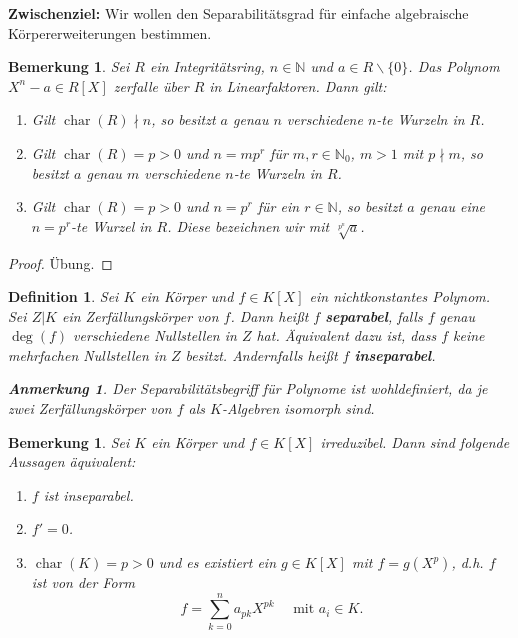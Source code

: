 \documentclass[a4paper, twoside, 11pt, ngerman]{report}
\newcommand{\NN}{\mathds N}
\renewcommand{\setminus}{\smallsetminus}
\DeclareMathOperator{\charact}{char}
\theoremstyle{definistyle}
\newtheorem{defini}[satz]{Definition}
\newtheorem{bem}[satz]{Bemerkung}
\newtheorem{anm}[satz]{Anmerkung}
\theoremstyle{remark}
\newcommand{\defn}[1]{\textit{\bfseries #1}}
\begin{document}
\textbf{Zwischenziel:} Wir wollen den Separabilitätsgrad für einfache algebraische Körpererweiterungen bestimmen.

\begin{bem}\label{bem:zerfallen_von_xn-a}
Sei $R$ ein Integritätsring, $n \in \NN$ und $a \in R\setminus\{0\}$.  
Das Polynom $X^n - a \in R[X]$ zerfalle über $R$ in Linearfaktoren. Dann gilt:
\begin{enumerate}
\item[(a)] Gilt $\charact(R)\nmid n$, so besitzt $a$ genau $n$ verschiedene $n$-te Wurzeln in $R$.
\item[(b)] Gilt $\charact(R)=p>0$ und $n = mp^r$ für $m,r\in\NN_0$, $m>1$ mit $p \nmid m$,  
so besitzt $a$ genau $m$ verschiedene $n$-te Wurzeln in $R$.
\item[(c)] Gilt $\charact(R)=p>0$ und $n = p^r$ für ein $r \in \NN$, so besitzt $a$ genau eine $n=p^r$-te Wurzel in $R$. Diese bezeichnen wir mit $\sqrt[p^n]{a}$.
\end{enumerate}
\end{bem}
\begin{proof}
Übung.
\end{proof}

\begin{defini}\label{def:separabel_polynom}
Sei $K$ ein Körper und $f \in K[X]$ ein nichtkonstantes Polynom. Sei $Z|K$ ein Zerfällungskörper von $f$.  
Dann heißt $f$ \defn{separabel}, falls $f$ genau $\deg(f)$ verschiedene Nullstellen in $Z$ hat. Äquivalent dazu ist, dass $f$ keine mehrfachen Nullstellen in $Z$ besitzt.  
Andernfalls heißt $f$ \defn{inseparabel}.

\begin{anm}
Der Separabilitätsbegriff für Polynome ist wohldefiniert, da je zwei Zerfällungskörper von $f$ als $K$-Algebren isomorph sind.
\end{anm}
\end{defini}

\begin{bem}\label{bem:inseparabilitaet_char_p}
Sei $K$ ein Körper und $f \in K[X]$ irreduzibel. Dann sind folgende Aussagen äquivalent:
\begin{enumerate}
\item[(i)] $f$ ist inseparabel.
\item[(ii)] $f' = 0$.
\item[(iii)] $\charact(K)=p>0$ und es existiert ein $g \in K[X]$ mit $f = g(X^p)$, d.h. $f$ ist von der Form
\[
f = \sum_{k=0}^n a_{pk} X^{p k} \quad \text{ mit } a_i \in K.
\]
\end{enumerate}
\end{bem}
\end{document}
